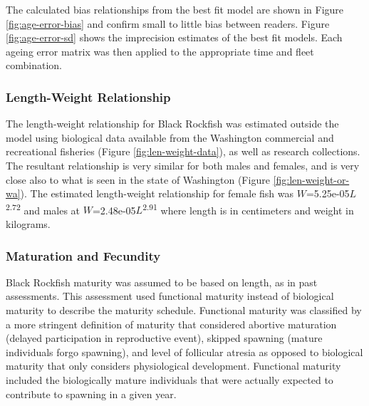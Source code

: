 \documentclass[11pt,
  letterpaper,
]{article}
\begin{document}
The calculated bias relationships from the best fit model are shown in Figure \ref{fig:age-error-bias} and confirm small to little bias between readers. Figure \ref{fig:age-error-sd} shows the imprecision estimates of the best fit models. Each ageing error matrix was then applied to the appropriate time and fleet combination.

\hypertarget{length-weight-relationship}{%
\subsubsection{Length-Weight Relationship}\label{length-weight-relationship}}

The length-weight relationship for Black Rockfish was estimated outside the model using biological data available from the Washington commercial and recreational fisheries (Figure \ref{fig:len-weight-data}), as well as research collections. The resultant relationship is very similar for both males and females, and is very close also to what is seen in the state of Washington (Figure \ref{fig:len-weight-or-wa}). The estimated length-weight relationship for female fish was \(W\)=5.25e-05\(L\)\textsuperscript{2.72} and males at \(W\)=2.48e-05\(L\)\textsuperscript{2.91} where length is in centimeters and weight in kilograms.

\hypertarget{maturation-and-fecundity}{%
\subsubsection{Maturation and Fecundity}\label{maturation-and-fecundity}}

Black Rockfish maturity was assumed to be based on length, as in past assessments. This assessment used functional maturity instead of biological maturity to describe the maturity schedule. Functional maturity was classified by a more stringent definition of maturity that considered abortive maturation (delayed participation in reproductive event), skipped spawning (mature individuals forgo spawning), and level of follicular atresia as opposed to biological maturity that only considers physiological development. Functional maturity included the biologically mature individuals that were actually expected to contribute to spawning in a given year.
\end{document}
